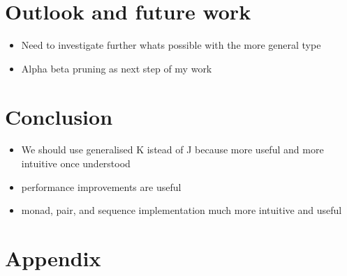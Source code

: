 \documentclass[runningheads]{llncs}
\providecommand{\tightlist}{%
  \setlength{\itemsep}{0pt}\setlength{\parskip}{0pt}}
\begin{document}
\section{Outlook and future work}\label{outlook-and-future-work}

\begin{itemize}
\tightlist
\item
  Need to investigate further whats possible with the more general type
\item
  Alpha beta pruning as next step of my work
\end{itemize}

\section{Conclusion}\label{conclusion}

\begin{itemize}
\tightlist
\item
  We should use generalised K istead of J because more useful and more
  intuitive once understood
\item
  performance improvements are useful
\item
  monad, pair, and sequence implementation much more intuitive and
  useful
\end{itemize}

%
%
%
% 
% 
%



\newpage
\section*{Appendix}
\appendix
\end{document}
